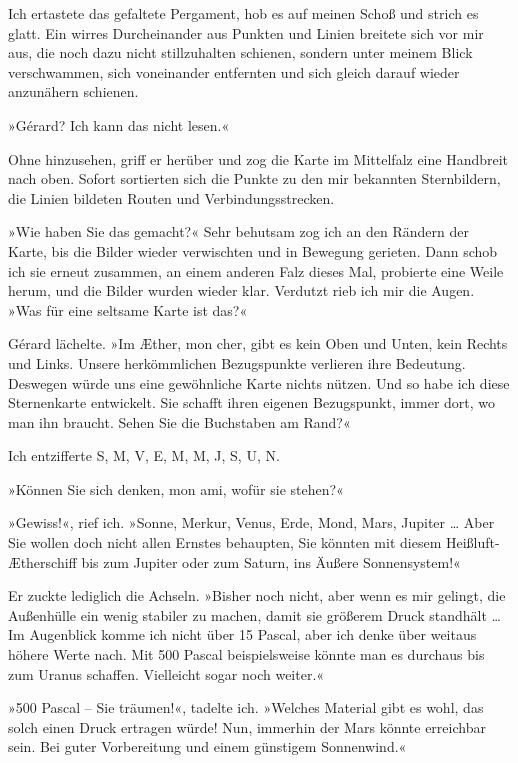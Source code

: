 Ich ertastete das gefaltete Pergament, hob es auf meinen Schoß und
strich es glatt. Ein wirres Durcheinander aus Punkten und Linien
breitete sich vor mir aus, die noch dazu nicht stillzuhalten
schienen, sondern unter meinem Blick verschwammen, sich voneinander
entfernten und sich gleich darauf wieder anzunähern schienen.

»Gérard? Ich kann das nicht lesen.«

Ohne hinzusehen, griff er herüber und zog die Karte im Mittelfalz
eine Handbreit nach oben. Sofort sortierten sich die Punkte zu den
mir bekannten Sternbildern, die Linien bildeten Routen und
Verbindungsstrecken.

»Wie haben Sie das gemacht?« Sehr behutsam zog ich an den Rändern
der Karte, bis die Bilder wieder verwischten und in Bewegung
gerieten. Dann schob ich sie erneut zusammen, an einem anderen Falz
dieses Mal, probierte eine Weile herum, und die Bilder wurden
wieder klar. Verdutzt rieb ich mir die Augen. »Was für eine
seltsame Karte ist das?«

Gérard lächelte. »Im Æther, mon cher, gibt es kein Oben und Unten,
kein Rechts und Links. Unsere herkömmlichen Bezugspunkte verlieren
ihre Bedeutung. Deswegen würde uns eine gewöhnliche Karte nichts
nützen. Und so habe ich diese Sternenkarte entwickelt. Sie schafft
ihren eigenen Bezugspunkt, immer dort, wo man ihn braucht. Sehen
Sie die Buchstaben am Rand?«

Ich entzifferte S, M, V, E, M, M, J, S, U, N.

»Können Sie sich denken, mon ami, wofür sie stehen?«

»Gewiss!«, rief ich. »Sonne, Merkur, Venus, Erde, Mond, Mars,
Jupiter \ldots{} Aber Sie wollen doch nicht allen Ernstes behaupten, Sie
könnten mit diesem Heißluft-Ætherschiff bis zum Jupiter oder zum
Saturn, ins Äußere Sonnensystem!«

Er zuckte lediglich die Achseln. »Bisher noch nicht, aber wenn es
mir gelingt, die Außenhülle ein wenig stabiler zu machen, damit sie
größerem Druck standhält \ldots{} Im Augenblick komme ich nicht über 15
Pascal, aber ich denke über weitaus höhere Werte nach. Mit 500
Pascal beispielsweise könnte man es durchaus bis zum Uranus
schaffen. Vielleicht sogar noch weiter.«

»500 Pascal – Sie träumen!«, tadelte ich. »Welches Material gibt es
wohl, das solch einen Druck ertragen würde! Nun, immerhin der Mars
könnte erreichbar sein. Bei guter Vorbereitung und einem günstigem
Sonnenwind.«

